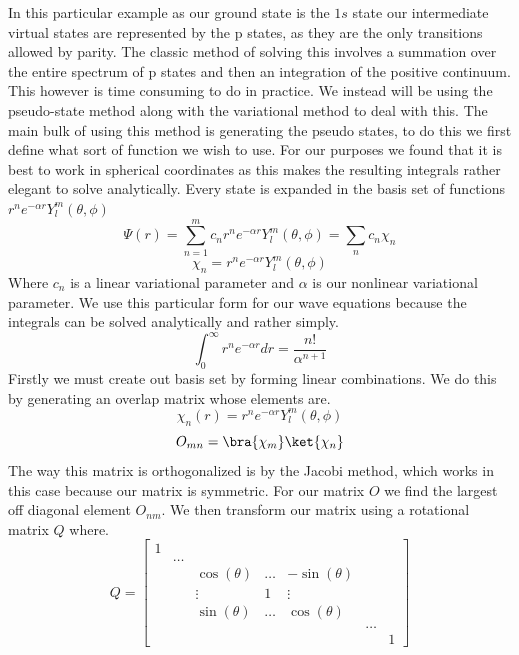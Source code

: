 In this particular example as our ground state is the \(1s\) state our intermediate virtual states are represented by the p states, as they are the only transitions allowed by parity. The classic method of solving this involves a summation over the entire spectrum of p states and then an integration of the positive continuum. This however is time consuming to do in practice. We instead will be using the pseudo-state method along with the variational method to deal with this.
	The main bulk of using this method is generating the pseudo states, to do this we first define what sort of function we wish to use. For our purposes we found that it is best to work in spherical coordinates as this makes the resulting integrals rather elegant to solve analytically. Every state is expanded in the basis set of functions \(r^n e^{-\alpha r}Y_l^m(\theta,\phi)\)\cite{shark}
	\begin{equation}
    \Psi(r)=\sum_{n=1}^{m}c_{n}r^{n}e^{-\alpha r}Y_{l}^{m}(\theta,\phi)
    =\sum_n c_n \chi_n
    \end{equation}
    \begin{equation}
        \chi_n=r^n e^{-\alpha r}Y_l^m(\theta,\phi)
    \end{equation}
    Where \(c_{n}\) is a linear variational parameter and \(\alpha\) is our nonlinear variational parameter. We use this particular form for our wave equations because the integrals can be solved analytically and rather simply.
    \begin{equation}
        \int_{0}^{\infty}r^{n}e^{-\alpha r}dr=\frac{n!}{\alpha^{n+1}}
    \end{equation}
 Firstly we must create out basis set by forming linear combinations. We do this by generating an overlap matrix whose elements are\cite{shark}.
 \begin{equation}
     \chi_{n}(r)=r^{n}e^{-\alpha r}Y_{l}^{m}(\theta,\phi)
 \end{equation}
 \begin{equation}
     O_{mn}=\bra{\chi_{m}}\ket{\chi_{n}}
 \end{equation}
  The way this matrix is orthogonalized is by the Jacobi method, which works in this case because our matrix is symmetric. For our matrix \(O\) we find the largest off diagonal element \(O_{nm}\). We then transform our matrix using a rotational matrix \(Q\) where\cite{jacobi}.
   \begin{equation}
     Q=\begin{bmatrix}
     1  &       &          &          &          &          &  \\
        &\hdots &          &          &          &          &  \\
        &       & \cos{(\theta)}  &\hdots   &-\sin{(\theta)}     & & \\  
        &       &\vdots &1      &\vdots & & \\  
                &       &\sin{(\theta)}   &\hdots   & \cos{(\theta)} & &\\
          &&&&&\hdots  \\    
            & & & & & &1
    \end{bmatrix}
 \end{equation}
